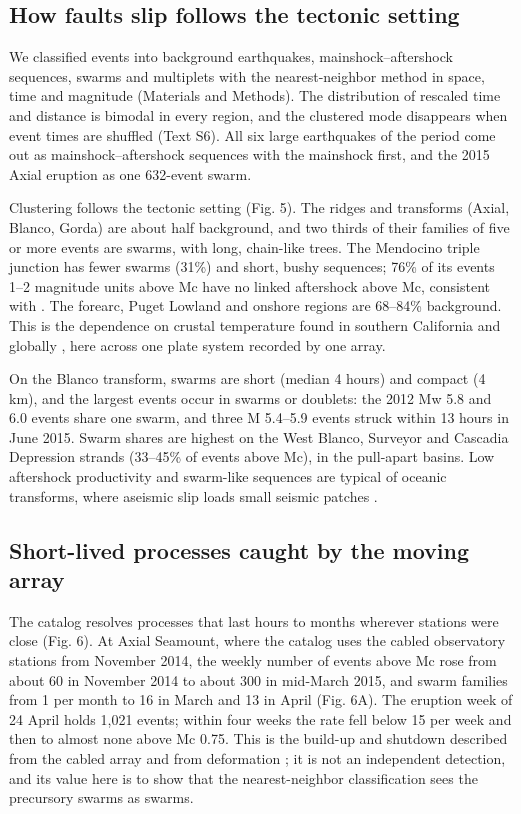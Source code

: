 \documentclass[11pt]{article}
\begin{document}
\subsection{How faults slip follows the tectonic
setting}\label{how-faults-slip-follows-the-tectonic-setting}

We classified events into background earthquakes, mainshock--aftershock
sequences, swarms and multiplets with the nearest-neighbor method in
space, time and magnitude
\citep{Baiesi2004, Zaliapin2008, Zaliapin2013a, Zaliapin2013} (Materials
and Methods). The distribution of rescaled time and distance is bimodal
in every region, and the clustered mode disappears when event times are
shuffled (Text S6). All six large earthquakes of the period come out as
mainshock--aftershock sequences with the mainshock first, and the 2015
Axial eruption as one 632-event swarm.

Clustering follows the tectonic setting (Fig. 5). The ridges and
transforms (Axial, Blanco, Gorda) are about half background, and two
thirds of their families of five or more events are swarms, with long,
chain-like trees. The Mendocino triple junction has fewer swarms (31\%)
and short, bushy sequences; 76\% of its events 1--2 magnitude units
above Mc have no linked aftershock above Mc, consistent with
\citet{Hsu2026}. The forearc, Puget Lowland and onshore regions are
68--84\% background. This is the dependence on crustal temperature found
in southern California and globally \citep{Zaliapin2013, Zaliapin2016},
here across one plate system recorded by one array.

On the Blanco transform, swarms are short (median 4 hours) and compact
(4 km), and the largest events occur in swarms or doublets: the 2012 Mw
5.8 and 6.0 events share one swarm, and three M 5.4--5.9 events struck
within 13 hours in June 2015. Swarm shares are highest on the West
Blanco, Surveyor and Cascadia Depression strands (33--45\% of events
above Mc), in the pull-apart basins. Low aftershock productivity and
swarm-like sequences are typical of oceanic transforms, where aseismic
slip loads small seismic patches
\citep{McGuire2005, Roland2009, Boettcher2009, Kuna2019}.

\subsection{Short-lived processes caught by the moving
array}\label{short-lived-processes-caught-by-the-moving-array}

The catalog resolves processes that last hours to months wherever
stations were close (Fig. 6). At Axial Seamount, where the catalog uses
the cabled observatory stations from November 2014, the weekly number of
events above Mc rose from about 60 in November 2014 to about 300 in
mid-March 2015, and swarm families from 1 per month to 16 in March and
13 in April (Fig. 6A). The eruption week of 24 April holds 1,021 events;
within four weeks the rate fell below 15 per week and then to almost
none above Mc 0.75. This is the build-up and shutdown described from the
cabled array and from deformation \citep{Wilcock2016, Nooner2016}; it is
not an independent detection, and its value here is to show that the
nearest-neighbor classification sees the precursory swarms as swarms.
\end{document}
